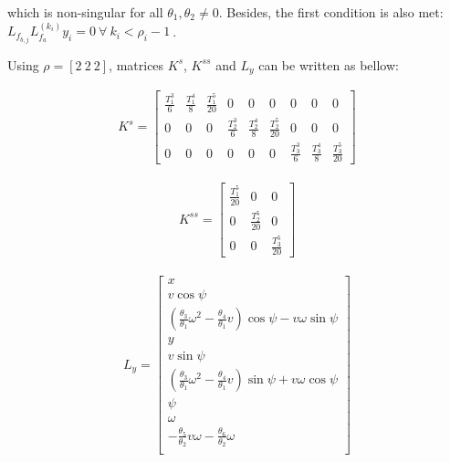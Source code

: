 \documentclass[letterpaper, 10 pt, conference]{ieeeconf}  %
\begin{document}
which is non-singular for all $\theta_1, \theta_2 \neq 0$. Besides, the first condition is also met: $L_{f_{b,j}}L^{(k_i)}_{f_a}y_i = 0\ \forall\ k_i < \rho_i-1\ $.

Using $\rho = [2\ 2\ 2]$, matrices $K^{s}$, $K^{ss}$ and $L_y$ can be written as bellow:

\begin{eqnarray}
K^s =
\left[\begin{array}{ccccccccc}
\frac{T_1^3}{6} & \frac{T_1^4}{8} & \frac{T_1^5}{20} & 0 & 0 & 0 & 0 & 0 & 0\\
0 & 0 & 0 & \frac{T_2^3}{6} & \frac{T_2^4}{8} & \frac{T_2^5}{20} & 0 & 0 & 0\\
0 & 0 & 0 & 0 & 0 & 0 & \frac{T_3^3}{6} & \frac{T_3^4}{8} & \frac{T_3^5}{20}
\end{array}\right]
\end{eqnarray}

\begin{eqnarray}
K^{ss} =
\left[\begin{array}{ccc}
\frac{T_1^5}{20} & 0 & 0\\
0 & \frac{T_2^5}{20} & 0\\
0 & 0 & \frac{T_3^5}{20}
\end{array}\right]
\end{eqnarray}


\begin{eqnarray}
L_y =
\left[\begin{array}{c}
x\\
v\cos\psi\\
\left(\frac{\theta_3}{\theta_1}\omega^2 - \frac{\theta_4}{\theta_1}v\right)\cos\psi - v\omega\sin\psi\\
y\\
v\sin\psi\\
\left(\frac{\theta_3}{\theta_1}\omega^2 - \frac{\theta_4}{\theta_1}v\right)\sin\psi + v\omega\cos\psi\\
\psi\\
\omega\\
-\frac{\theta_5}{\theta_2}v\omega - \frac{\theta_6}{\theta_2}\omega\\
\end{array}\right]
\end{eqnarray}
\end{document}

